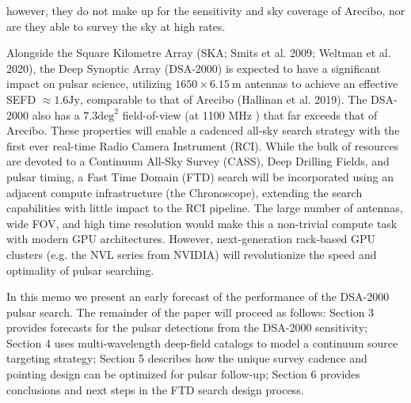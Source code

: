\documentclass[10pt]{article}
\begin{document}
however, they do not make up for the sensitivity and sky coverage of Arecibo, nor are they able to survey the sky at high rates.

Alongside the Square Kilometre Array (SKA; Smits et al. 2009; Weltman et al. 2020), the Deep Synoptic Array (DSA-2000) is expected to have a significant impact on pulsar science, utilizing \(1650 \times 6.15 \mathrm{~m}\) antennas to achieve an effective SEFD \(\approx 1.6 \mathrm{Jy}\), comparable to that of Arecibo (Hallinan et al. 2019). The DSA-2000 also has a \(7.3 \mathrm{deg}^{2}\) field-of-view (at 1100 MHz ) that far exceeds that of Arecibo. These properties will enable a cadenced all-sky search strategy with the first ever real-time Radio Camera Instrument (RCI). While the bulk of resources are devoted to a Continuum All-Sky Survey (CASS), Deep Drilling Fields, and pulsar timing, a Fast Time Domain (FTD) search will be incorporated using an adjacent compute infrastructure (the Chronoscope), extending the search capabilities with little impact to the RCI pipeline. The large number of antennas, wide FOV, and high time resolution would make this a non-trivial compute task with modern GPU architectures. However, next-generation rack-based GPU clusters (e.g. the NVL series from NVIDIA) will revolutionize the speed and optimality of pulsar searching.

In this memo we present an early forecast of the performance of the DSA-2000 pulsar search. The remainder of the paper will proceed as follows: Section 3 provides forecasts for the pulsar detections from the DSA-2000 sensitivity; Section 4 uses multi-wavelength deep-field catalogs to model a continuum source targeting strategy; Section 5 describes how the unique survey cadence and pointing design can be optimized for pulsar follow-up; Section 6 provides conclusions and next steps in the FTD search design process.
\end{document}
